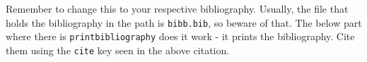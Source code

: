 \documentclass[10pt,a4paper]{article}
\begin{document}
Remember to change this to your respective bibliography. Usually, the file that holds the bibliography in the path is \texttt{bibb.bib}, so beware of that. The below part where there is \texttt{printbibliography} does it work - it prints the bibliography. Cite them using the \texttt{cite} key seen in the above citation. 

\medskip

\printbibliography %
\end{document}
